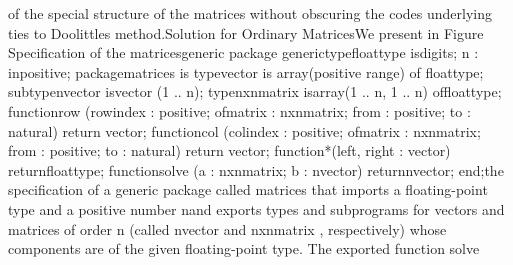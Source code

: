 of the special structure of the matrices without obscuring the code\rsquo[]s
underlying ties to Doolittle\rsquo[]s method.\Endpara[]
\HdMinLiv[]Solution for Ordinary
Matrices\HdMinEndiv[]
\Para[]We present in Figure 
\Parbox[]
Specification of the %
\tyxffmxmono[]matrices\tyxffmxendmono[] generic package%
\FgEndcap[]
\Comp[]\tyxtstxbf[]generic\tyxtstxendbf[]
   \tyxtstxbf[]type\tyxtstxendbf[] float\Symuns[]type %
\tyxtstxbf[]is\tyxtstxendbf[] \tyxtstxbf[]digits\tyxtstxendbf[] \Symlt[]\Symgt[];
   n : \tyxtstxbf[]in\tyxtstxendbf[] positive;
\tyxtstxbf[]package\tyxtstxendbf[] matrices \tyxtstxbf[]is%
\tyxtstxendbf[]
   \tyxtstxbf[]type\tyxtstxendbf[]    vector     \tyxtstxbf[]is%
\tyxtstxendbf[] \tyxtstxbf[]array\tyxtstxendbf[] (positive %
\tyxtstxbf[]range\tyxtstxendbf[] \Symlt[]\Symgt[]) \tyxtstxbf[]of%
\tyxtstxendbf[] float\Symuns[]type;
   \tyxtstxbf[]subtype\tyxtstxendbf[] n\Symuns[]vector   %
\tyxtstxbf[]is\tyxtstxendbf[] vector (1 .. n);
   \tyxtstxbf[]type\tyxtstxendbf[]    nxn\Symuns[]matrix %
\tyxtstxbf[]is\tyxtstxendbf[] \tyxtstxbf[]array\tyxtstxendbf[] (1 .. n, 1 .. n) %
\tyxtstxbf[]of\tyxtstxendbf[] float\Symuns[]type;
   \tyxtstxbf[]function\tyxtstxendbf[] row (row\Symuns[]index : positive;
                 of\Symuns[]matrix : nxn\Symuns[]matrix;
                 from      : positive;
                 to        : natural) \tyxtstxbf[]return%
\tyxtstxendbf[] vector;
   \tyxtstxbf[]function\tyxtstxendbf[] col (col\Symuns[]index : positive;
                 of\Symuns[]matrix : nxn\Symuns[]matrix;
                 from      : positive;
                 to        : natural) \tyxtstxbf[]return%
\tyxtstxendbf[] vector;
   \tyxtstxbf[]function\tyxtstxendbf[] \quot[]*\quot[] (left, right : vector) %
\tyxtstxbf[]return\tyxtstxendbf[] float\Symuns[]type;
   \tyxtstxbf[]function\tyxtstxendbf[] solve (a : nxn\Symuns[]matrix; b : n\Symuns[]vector) %
\tyxtstxbf[]return\tyxtstxendbf[] n\Symuns[]vector;
\tyxtstxbf[]end\tyxtstxendbf[];\Endcomp[]
\EndParbox[]
\FgEndblock[]
 the specification of a generic package called \tyxffmxmono[]matrices%
\tyxffmxendmono[] that imports a floating-point type and a positive
number \tyxffmxmono[]n\tyxffmxendmono[] and exports types and subprograms
for vectors and matrices of order \tyxffmxmono[]n%
\tyxffmxendmono[] (called \tyxffmxmono[]n\Symuns[]vector%
\tyxffmxendmono[] and \tyxffmxmono[]nxn\Symuns[]matrix%
\tyxffmxendmono[], respectively) whose components are of the given
floating-point type. The exported function \tyxffmxmono[]solve%
